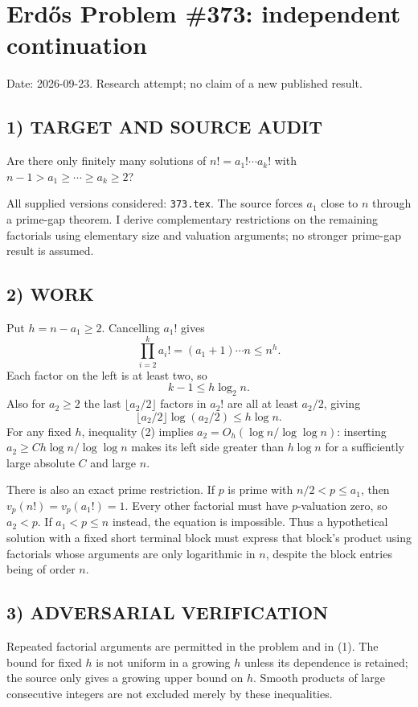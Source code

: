 \section{Erd\H{o}s Problem \#373: independent continuation}
\noindent Date: 2026-09-23. Research attempt; no claim of a new published result.
\subsection{1) TARGET AND SOURCE AUDIT}
Are there only finitely many solutions of $n!=a_1!\cdots a_k!$ with $n-1>a_1\ge\cdots\ge a_k\ge2$?

All supplied versions considered: \texttt{373.tex}.
The source forces $a_1$ close to $n$ through a prime-gap theorem. I derive complementary restrictions on the remaining factorials using elementary size and valuation arguments; no stronger prime-gap result is assumed.
\subsection{2) WORK}
Put $h=n-a_1\ge2$. Cancelling $a_1!$ gives
\[
\prod_{i=2}^k a_i!=(a_1+1)\cdots n\le n^h.
\]
Each factor on the left is at least two, so
\[
k-1\le h\log_2 n. \tag{1}
\]
Also for $a_2\ge2$ the last $\lfloor a_2/2\rfloor$ factors in $a_2!$ are all at least $a_2/2$, giving
\[
\lfloor a_2/2\rfloor\log(a_2/2)\le h\log n. \tag{2}
\]
For any fixed $h$, inequality (2) implies $a_2=O_h(\log n/\log\log n)$: inserting $a_2\ge C h\log n/\log\log n$ makes its left side greater than $h\log n$ for a sufficiently large absolute $C$ and large $n$.

There is also an exact prime restriction. If $p$ is prime with $n/2<p\le a_1$, then $v_p(n!)=v_p(a_1!)=1$. Every other factorial must have $p$-valuation zero, so $a_2<p$. If $a_1<p\le n$ instead, the equation is impossible. Thus a hypothetical solution with a fixed short terminal block must express that block's product using factorials whose arguments are only logarithmic in $n$, despite the block entries being of order $n$.
\subsection{3) ADVERSARIAL VERIFICATION}
Repeated factorial arguments are permitted in the problem and in (1). The bound for fixed $h$ is not uniform in a growing $h$ unless its dependence is retained; the source only gives a growing upper bound on $h$. Smooth products of large consecutive integers are not excluded merely by these inequalities.
